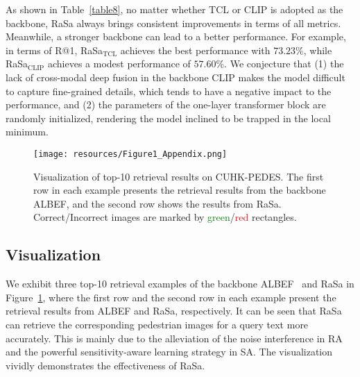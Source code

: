 \documentclass{article}
\begin{document}
As shown in Table~\ref{table8}, no matter whether TCL or CLIP is adopted as the backbone, RaSa always brings consistent improvements in terms of all metrics.
Meanwhile, a stronger backbone can lead to a better performance.
For example, in terms of R@1, RaSa$_\text{TCL}$ achieves the best performance with $73.23$\%,
while RaSa$_\text{CLIP}$ achieves a modest performance of $57.60$\%.
We conjecture that (1) the lack of cross-modal deep fusion in the backbone CLIP makes the model difficult to capture fine-grained details, which tends to have a negative impact to the performance, and (2) the parameters of the one-layer transformer block are randomly initialized, rendering the model inclined to be trapped in the local minimum.



\begin{figure}[t]
\centering
\texttt{[image: resources/Figure1\_Appendix.png]} \caption{Visualization of top-10 retrieval results on CUHK-PEDES.
The first row in each example presents the retrieval results from the backbone ALBEF, and the second row shows the results from RaSa.
Correct/Incorrect images are marked by \textcolor{green}{green}/\textcolor{red}{red} rectangles.}
\label{fig5}
\end{figure}


\subsection{Visualization}
\label{visualization}
We exhibit three top-10 retrieval examples of the backbone ALBEF~\cite{NEURIPS2021_50525975} and RaSa in Figure~\ref{fig5}, where the first row and the second row in each example present the retrieval results from ALBEF and RaSa, respectively.
It can be seen that RaSa can retrieve the corresponding pedestrian images for a query text more accurately. 
This is mainly due to the alleviation of the noise interference in RA and the powerful sensitivity-aware learning strategy in SA.
The visualization vividly demonstrates the effectiveness of RaSa. 
\end{document}

